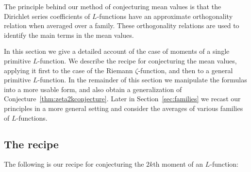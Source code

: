 \documentclass[12pt,letterpaper]{amsart}
\theoremstyle{plain}
\theoremstyle{definition}
\theoremstyle{remark}
\numberwithin{equation}{subsection}
\numberwithin{theorem}{subsection}
\numberwithin{table}{subsection}
\begin{document}
The principle behind our method of conjecturing mean values is
that the Dirichlet series coefficients of $L$-functions have
an approximate orthogonality relation when averaged over a family.
These orthogonality relations are used to identify the main terms
in the mean values.

In this section we give a detailed account of the case of 
moments of a single primitive $L$-function. 
We describe the recipe for conjecturing the mean values,
applying it first to the case of the Riemann $\zeta$-function,
and then to a general primitive $L$-function.
In the remainder of this section we manipulate the formulas into
a more usable form, and also obtain a generalization of
Conjecture~\ref{thm:zeta2kconjecture}.
Later in Section~\ref{sec:families}
we recast our principles in a more general setting and consider
the averages of various families of $L$-functions.


\subsection{ The recipe
}\label{sec:therecipe}
The following is our recipe for conjecturing the $2k$th moment
of an $L$-function:
\end{document}
